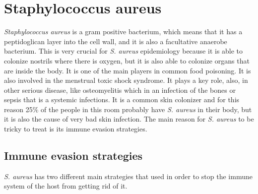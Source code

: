 \graphicspath{{chapters/images/09/}}

\chapter{Staphylococcus aureus}

\emph{Staphylococcus aureus} is a gram positive bacterium, which means that it has a peptidoglican layer into the cell wall, and it is also a facultative anaerobe bacterium. This is very crucial for \emph{S. aureus} epidemiology because it is able to colonize nostrils where there is oxygen, but it is also able to colonize organs that are inside the body. It is  one of the main players in common food poisoning. It is also involved in the menstrual toxic shock syndrome. It plays a key role, also, in other serious disease, like osteomyelitis which in an infection of the bones or sepsis that is a systemic infections. 
It is a common skin colonizer and for this reason 25$\%$ of the people in this room probably have \emph{S. aureus} in their body, but it is also the cause of very bad skin infection. 
The main reason for \emph{S. aureus} to be tricky to treat is its immune evasion strategies.

\section{Immune evasion strategies}

\emph{S. aureus} has two different main strategies that used in order to stop the immune system of the host from getting rid of it. 

